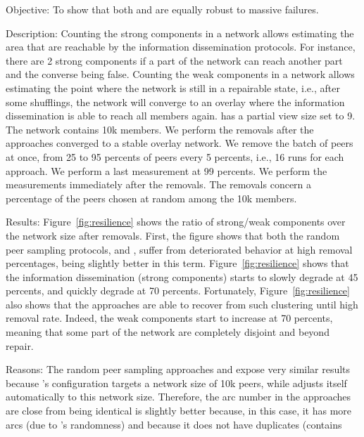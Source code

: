 \begin{asparadesc}
\item[Objective:] To show that both \SPRAY and \CYCLON are equally robust to
  massive failures.
\item[Description:] Counting the strong components in a network allows
  estimating the area that are reachable by the information dissemination
  protocols. For instance, there are 2 strong components if a part of the
  network can reach another part and the converse being false.  Counting the
  weak components in a network allows estimating the point where the network is
  still in a repairable state, i.e., after some shufflings, the network will
  converge to an overlay where the information dissemination is able to reach
  all members again. \CYCLON has a partial view size set to 9. The network
  contains 10k members. We perform the removals after the approaches converged
  to a stable overlay network. We remove the batch of peers at once, from 25 to
  95 percents of peers every 5 percents, i.e., 16 runs for each approach. We
  perform a last measurement at 99 percents. We perform the measurements
  immediately after the removals. The removals concern a percentage of the
  peers chosen at random among the 10k members.
\item[Results:] Figure~\ref{fig:resilience} shows the ratio of strong/weak
  components over the network size after removals. First, the figure shows
  that both the random peer sampling protocols, \SPRAY and \CYCLON, suffer from
  deteriorated behavior at high removal percentages, \CYCLON being slightly
  better in this term. Figure~\ref{fig:resilience} shows that the information
  dissemination (strong components) starts to slowly degrade at 45 percents,
  and quickly degrade at 70 percents. Fortunately, Figure~\ref{fig:resilience}
  also shows that the approaches are able to recover from such clustering until
  high removal rate. Indeed, the weak components start to increase at 70
  percents, meaning that some part of the network are completely disjoint and
  beyond repair.
\item[Reasons:] The random peer sampling approaches \CYCLON and \SPRAY expose
  very similar results because \CYCLON's configuration targets a network size
  of 10k peers, while \SPRAY adjusts itself automatically to this network size.
  Therefore, the arc number in the approaches are close from being identical
  \CYCLON is slightly better because, in this case, it has more arcs (due to
  \SPRAY's randomness) and because it does not have duplicates (\SPRAY contains

\end{asparadesc}
